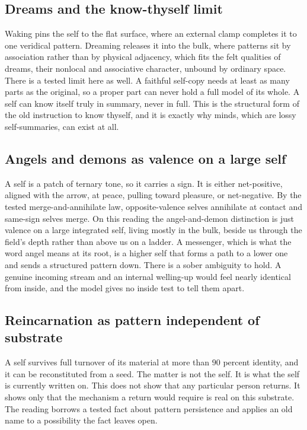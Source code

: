 \subsection{Dreams and the know-thyself limit}

Waking pins the self to the flat surface, where an external clamp completes it to one veridical pattern. Dreaming
releases it into the bulk, where patterns sit by association rather than by physical adjacency, which fits the felt
qualities of dreams, their nonlocal and associative character, unbound by ordinary space. There is a tested limit
here as well. A faithful self-copy needs at least as many parts as the original, so a proper part can never hold a
full model of its whole. A self can know itself truly in summary, never in full. This is the structural form of
the old instruction to know thyself, and it is exactly why minds, which are lossy self-summaries, can exist at
all.

\subsection{Angels and demons as valence on a large self}

A self is a patch of ternary tone, so it carries a sign. It is either net-positive, aligned with the arrow, at
peace, pulling toward pleasure, or net-negative. By the tested merge-and-annihilate law, opposite-valence selves
annihilate at contact and same-sign selves merge. On this reading the angel-and-demon distinction is just valence
on a large integrated self, living mostly in the bulk, beside us through the field's depth rather than above us on
a ladder. A messenger, which is what the word angel means at its root, is a higher self that forms a path to a
lower one and sends a structured pattern down. There is a sober ambiguity to hold. A genuine incoming stream and
an internal welling-up would feel nearly identical from inside, and the model gives no inside test to tell them
apart.

\subsection{Reincarnation as pattern independent of substrate}

A self survives full turnover of its material at more than $90$ percent identity, and it can be reconstituted from
a seed. The matter is not the self. It is what the self is currently written on. This does not show that any
particular person returns. It shows only that the mechanism a return would require is real on this substrate. The
reading borrows a tested fact about pattern persistence and applies an old name to a possibility the fact leaves
open.

